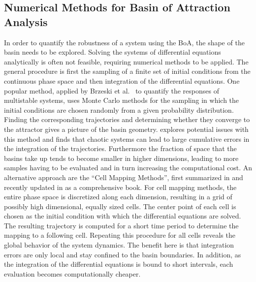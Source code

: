 \subsection{Numerical Methods for Basin of Attraction Analysis} \label{Numerical Methods}
In order to quantify the robustness of a system using the BoA, the shape of the basin needs to be explored. Solving the systems of differential equations analytically is often not feasible, requiring numerical methods to be applied. The general procedure is first the sampling of a finite set of initial conditions from the continuous phase space and then integration of the differential equations. One popular method, applied by Brzeski et al.\ \cite{multistable} to quantify the responses of multistable systems, uses Monte Carlo methods for the sampling in which the initial conditions are chosen randomly from a given probability distribution. Finding the corresponding trajectories and determining whether they converge to the attractor gives a picture of the basin geometry. \cite{limitsBoA} explores potential issues with this method and finds that chaotic systems can lead to large cumulative errors in the integration of the trajectories. Furthermore the fraction of space that the basins take up tends to become smaller in higher dimensions, leading to more samples having to be evaluated and in turn increasing the computational cost.
An alternative approach are the “Cell Mapping Methods”, first summarized in \cite{cell1} and recently updated in \cite{cell2} as a comprehensive book. For cell mapping methods, the entire phase space is discretized along each dimension, resulting in a grid of possibly high dimensional, equally sized cells. The center point of each cell is chosen as the initial condition with which the differential equations are solved. The resulting trajectory is computed for a short time period to determine the mapping to a following cell. Repeating this procedure for all cells reveals the global behavior of the system dynamics. The benefit here is that integration errors are only local and stay confined to the basin boundaries. In addition, as the integration of the differential equations is bound to short intervals, each evaluation becomes computationally cheaper.

